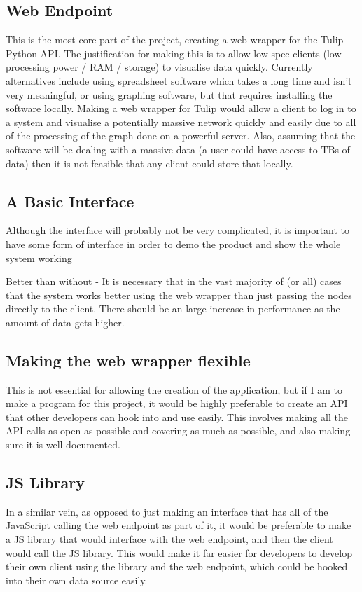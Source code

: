 \documentclass[../dissertation.tex]{subfiles}
\begin{document}
\subsection{Web Endpoint}

This is the most core part of the project, creating a web wrapper for the Tulip Python API. The justification for making this is to allow low spec clients (low processing power / RAM / storage) to visualise data quickly. Currently alternatives include using spreadsheet software which takes a long time and isn't very meaningful, or using graphing software, but that requires installing the software locally. Making a web wrapper for Tulip would allow a client to log in to a system and visualise a potentially massive network quickly and easily due to all of the processing of the graph done on a powerful server. Also, assuming that the software will be dealing with a massive data (a user could have access to TBs of data) then it is not feasible that any client could store that locally.

\subsection{A Basic Interface}

Although the interface will probably not be very complicated, it is important to have some form of interface in order to demo the product and show the whole system working

Better than without - It is necessary that in the vast majority of (or all) cases that the system works better using the web wrapper than just passing the nodes directly to the client. There should be an large increase in performance as the amount of data gets higher.

\subsection{Making the web wrapper flexible}
This is not essential for allowing the creation of the application, but if I am to make a program for this project, it would be highly preferable to create an API that other developers can hook into and use easily. This involves making all the API calls as open as possible and covering as much as possible, and also making sure it is well documented.

\subsection{JS Library}
In a similar vein, as opposed to just making an interface that has all of the JavaScript calling the web endpoint as part of it, it would be preferable to make a JS library that would interface with the web endpoint, and then the client would call the JS library. This would make it far easier for developers to develop their own client using the library and the web endpoint, which could be hooked into their own data source easily.
\end{document}
